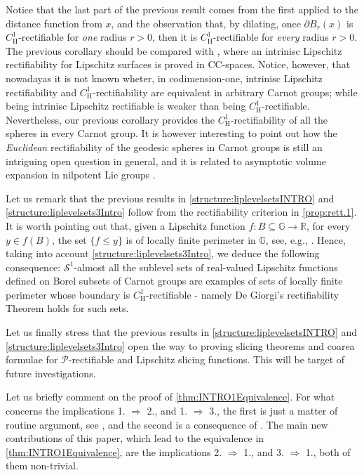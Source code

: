 \documentclass[10pt, a4paper,
oneside, headinclude,footinclude]{scrartcl}
\begin{document}
Notice that the last part of the previous result comes from the first applied to the distance function from $x$, and the observation that, by dilating, once $\partial B_r(x)$ is $C^1_{\mathrm H}$-rectifiable for \emph{one} radius $r>0$, then it is $C^1_{\mathrm H}$-rectifiable for \emph{every} radius $r>0$. The previous corollary should be compared with \cite[Theorem 3.2]{Vit12}, where an intrinisc Lipschitz rectifiability for Lipschitz surfaces is proved in CC-spaces. Notice, however, that nowadayas it is not known wheter, in codimension-one, intrinisc Lipschitz rectifiability and $C^1_{\mathrm H}$-rectifiability are equivalent in arbitrary Carnot groups; while being intrinisc Lipschitz rectifiable is weaker than being $C^1_{\mathrm H}$-rectifiable. Nevertheless, our previous corollary provides the $C^1_{\mathrm H}$-rectifiability of all the spheres in every Carnot group. It is however interesting to point out how the {\em Euclidean} rectifiability of the geodesic spheres in Carnot groups is still an intriguing open question in general, and it is related to asymptotic volume expansion in nilpotent Lie groups \cite{BrLD, LeDonneNGTAMS}.


Let us remark that the previous results in \cref{structure:liplevelsetsINTRO} and \cref{structure:liplevelsets3Intro} follow from the rectifiability criterion in \cref{prop:rett.1}. It is worth pointing out that, given a Lipschitz function $f:B\subseteq\mathbb G\to\mathbb R$, for every $y\in f(B)$, the set $\{f\leq y\}$ is of locally finite perimeter in $\mathbb G$, see, e.g., \cite[Theorem 2.40]{DonVittone19}. Hence, taking into account \cref{structure:liplevelsets3Intro}, we deduce the following consequence: $\mathcal{S}^1$-almost all the sublevel sets of real-valued Lipschitz functions defined on Borel subsets of Carnot groups are examples of sets of locally finite perimeter whose boundary is $C^1_{\mathrm H}$-rectifiable - namely De Giorgi's rectifiability Theorem holds for such sets.

Let us finally stress that the previous results in \cref{structure:liplevelsetsINTRO} and \cref{structure:liplevelsets3Intro} open the way to proving slicing theorems and coarea formulae for $\mathscr{P}$-rectifiable and Lipschitz slicing functions. This will be target of future investigations.

\vspace{0.3cm}


Let us briefly comment on the proof of \cref{thm:INTRO1Equivalence}. For what concerns the implications 1. $\Rightarrow$ 2., and 1. $\Rightarrow$ 3., the first is just a matter of routine argument, see \cite[Remark 14.4(3)]{Mattila1995GeometrySpaces}, and the second is a consequence of \cite[Theorem 1.8]{antonelli2020rectifiable}. The main new contributions of this paper, which lead to the equivalence in \cref{thm:INTRO1Equivalence}, are the implications 2. $\Rightarrow$ 1., and 3. $\Rightarrow$ 1., both of them non-trivial. 
\end{document}
